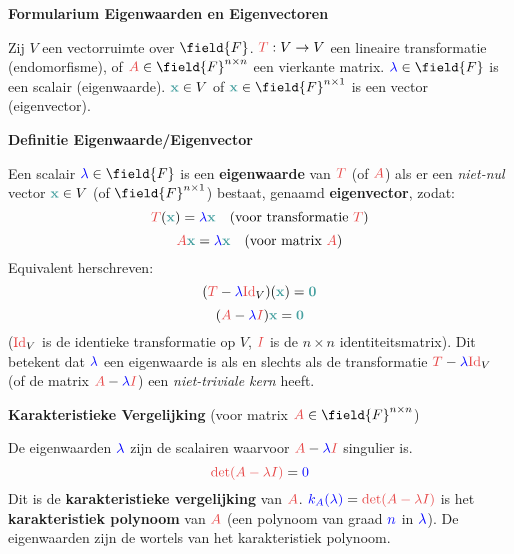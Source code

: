 \documentclass[12pt]{article}
\renewcommand{\vec}[1]{\textcolor{vectorTeal}{\mathbf{#1}}}
\newcommand{\scalar}[1]{\textcolor{scalarBrightBlue}{#1}}
\newcommand{\mat}[1]{\textcolor{matrixSoftRed}{#1}}
\newcommand{\Id}{\mat{\mathrm{Id}}}
\newcommand{\matI}{\mat{I}} %
\begin{document}
\begin{center}
\Large \textbf{Formularium Eigenwaarden en Eigenvectoren}
\end{center}

\vspace{1em} %

Zij $V$ een vectorruimte over $\field{F}$. $\mat{T}: V \to V$ een lineaire transformatie (endomorfisme), of $\mat{A} \in \field{F}^{n \times n}$ een vierkante matrix.
$\scalar{\lambda} \in \field{F}$ is een scalair (eigenwaarde). $\vec{x} \in V$ of $\vec{x} \in \field{F}^{n \times 1}$ is een vector (eigenvector).

\vspace{1.5em} %
{\centering
\textcolor{headerBrown}{\large\textbf{Definitie Eigenwaarde/Eigenvector}}
\par
}%
Een scalair $\scalar{\lambda} \in \field{F}$ is een \textbf{eigenwaarde} van $\mat{T}$ (of $\mat{A}$) als er een \textit{niet-nul} vector $\vec{x} \in V$ (of $\field{F}^{n \times 1}$) bestaat, genaamd \textbf{eigenvector}, zodat:
\[
\mat{T}(\vec{x}) = \scalar{\lambda} \vec{x} \quad \text{(voor transformatie } \mat{T})
\]
\[
\mat{A} \vec{x} = \scalar{\lambda} \vec{x} \quad \text{(voor matrix } \mat{A})
\]
Equivalent herschreven:
\[
(\mat{T} - \scalar{\lambda} \Id_V) (\vec{x}) = \vec{0}
\]
\[
(\mat{A} - \scalar{\lambda} \matI) \vec{x} = \vec{0}
\]
($\Id_V$ is de identieke transformatie op $V$, $\matI$ is de $n \times n$ identiteitsmatrix).
Dit betekent dat $\scalar{\lambda}$ een eigenwaarde is als en slechts als de transformatie $\mat{T} - \scalar{\lambda} \Id_V$ (of de matrix $\mat{A} - \scalar{\lambda} \matI$) een \textit{niet-triviale kern} heeft.

\vspace{1.5em} %
{\centering
\textcolor{headerBrown}{\large\textbf{Karakteristieke Vergelijking}} (voor matrix $\mat{A} \in \field{F}^{n \times n}$)
\par
}%
De eigenwaarden $\scalar{\lambda}$ zijn de scalairen waarvoor $\mat{A} - \scalar{\lambda} \matI$ singulier is.
\[
\mat{\det(A - \lambda I)} = \scalar{0}
\]
Dit is de \textbf{karakteristieke vergelijking} van $\mat{A}$.
$\scalar{k_A(\lambda)} = \mat{\det(A - \lambda I)}$ is het \textbf{karakteristiek polynoom} van $\mat{A}$ (een polynoom van graad $\scalar{n}$ in $\scalar{\lambda}$).
De eigenwaarden zijn de wortels van het karakteristiek polynoom.
\end{document}
